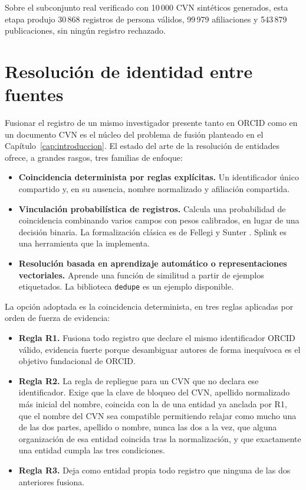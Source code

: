 Sobre el subconjunto real verificado con 10\,000 CVN sintéticos generados,
esta etapa produjo 30\,868 registros de persona válidos, 99\,979
afiliaciones y 543\,879 publicaciones, sin ningún registro rechazado.

\section{Resolución de identidad entre fuentes}
\label{sec:procesamiento_resolucion}

Fusionar el registro de un mismo investigador presente tanto en ORCID como
en un documento CVN es el núcleo del problema de fusión planteado en el
Capítulo~\ref{cap:introduccion}. El estado del arte de la resolución de
entidades ofrece, a grandes rasgos, tres familias de enfoque:

\begin{itemize}
  \sloppy
  \item \textbf{Coincidencia determinista por reglas explícitas.} Un
  identificador único compartido y, en su ausencia, nombre normalizado y
  afiliación compartida.
  \item \textbf{Vinculación probabilística de registros.} Calcula una
  probabilidad de coincidencia combinando varios campos con pesos
  calibrados, en lugar de una decisión binaria. La formalización clásica
  es de Fellegi y Sunter \cite{fellegi_sunter_1969}. Splink
  \cite{splink_docs} es una herramienta que la implementa.
  \item \textbf{Resolución basada en aprendizaje automático o
  representaciones vectoriales.} Aprende una función de similitud a
  partir de ejemplos etiquetados. La biblioteca \texttt{dedupe}
  \cite{dedupe_docs} es un ejemplo disponible.
\end{itemize}

La opción adoptada es la coincidencia determinista, en tres reglas
aplicadas por orden de fuerza de evidencia:

\begin{itemize}
  \item \textbf{Regla R1.} Fusiona todo registro que declare el mismo
  identificador ORCID válido, evidencia fuerte porque desambiguar autores
  de forma inequívoca es el objetivo fundacional de ORCID.
  \item \textbf{Regla R2.} La regla de repliegue para un CVN que no
  declara ese identificador. Exige que la clave de bloqueo del CVN,
  apellido normalizado más inicial del nombre, coincida con la de una
  entidad ya anclada por R1, que el nombre del CVN sea compatible
  permitiendo relajar como mucho una de las dos partes, apellido o nombre,
  nunca las dos a la vez, que alguna organización de esa entidad coincida
  tras la normalización, y que exactamente una entidad cumpla las tres
  condiciones.
  \item \textbf{Regla R3.} Deja como entidad propia todo registro que
  ninguna de las dos anteriores fusiona.
\end{itemize}

